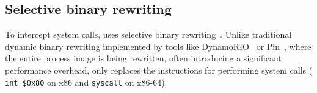 


\subsection{Selective binary rewriting}
\label{sec:rewriting}


To intercept system calls, \varan uses selective binary
rewriting~\cite{bird}. Unlike traditional dynamic binary rewriting
implemented by tools like DynamoRIO~\cite{dynamorio02} or
Pin~\cite{pin05}, where the entire process image is being rewritten,
often introducing a significant performance overhead, \varan only
replaces the instructions for performing system calls (\ie
\lstinline[language={[x64]Assembler}]`int $0x80` on x86 and
\lstinline[language={[x64]Assembler}]`syscall` on x86-64).

